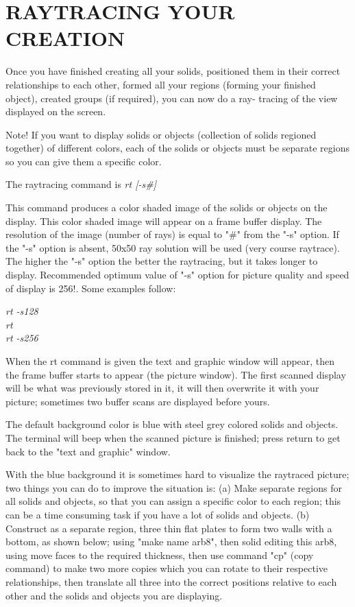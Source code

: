 \chapter{RAYTRACING YOUR CREATION}

Once you have finished creating all your solids, positioned them in
their correct relationships to each other, formed all your regions (forming
your finished object), created groups (if required), you can now do a ray-
tracing of the view displayed on the screen.

Note!  If you want to display solids or objects (collection of solids
regioned together) of different colors, each of the solids or objects must be
separate regions so you can give them a specific color.

The raytracing command is
{\em\center
  rt [-s\#]
}

This command produces a color shaded image of the solids or objects on
the display.  This color shaded image  will appear on a frame buffer display.
The resolution of the image (number of rays) is equal to "\#" from the "-s"
option.  If the "-s" option is absent, 50x50 ray solution will be used (very
course raytrace).  The higher the "-s" option the better the raytracing, but
it takes longer to display.
Recommended optimum value of "-s" option for picture
quality and speed of display is 256!.  Some examples follow:

{\em
             rt -s128 \\
             rt \\
             rt -s256 \\
}

When the rt command is given the text and graphic window will appear,
then the frame buffer starts to appear (the picture window).  The first scanned
display will be what was previously stored in it, it will then overwrite it
with your picture; sometimes two buffer scans are displayed before yours.

The default background color is blue with steel grey colored solids and
objects.  The terminal will beep when the scanned picture is finished; press
return to get back to the "text and graphic" window.

With the blue background it is sometimes hard to visualize the raytraced
picture; two things you can do to improve the situation is:
     (a)  Make separate regions for all solids and objects, so that you can
assign a specific color to each region; this can be a time consuming task if
you have a lot of solids and objects.
     (b)  Construct as a separate region, three thin flat plates to form two
walls with a bottom, as shown below; using "make name arb8",
then solid editing this arb8, using move faces to the required thickness,
then use command "cp"
(copy command) to make two more copies which you can rotate to their
respective relationships, then translate all three into the correct positions
relative to each other and the solids and objects you are displaying.

